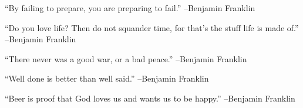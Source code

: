 \documentclass{article}%
\begin{document}
\linebreak%
\vspace{1mm}%
\begin{minipage}{\textwidth}%
\flushleft%
“By failing to prepare, you are preparing to fail.”%
\linebreak%
\vspace{1mm}%
–Benjamin Franklin%
\linebreak%
\vspace{1mm}%
\end{minipage}%
\linebreak%
\vspace{1mm}%
\begin{minipage}{\textwidth}%
\flushleft%
“Do you love life? Then do not squander time, for that's the stuff life is made of.”%
\linebreak%
\vspace{1mm}%
–Benjamin Franklin%
\linebreak%
\vspace{1mm}%
\end{minipage}%
\linebreak%
\vspace{1mm}%
\begin{minipage}{\textwidth}%
\flushleft%
“There never was a good war, or a bad peace.”%
\linebreak%
\vspace{1mm}%
–Benjamin Franklin%
\linebreak%
\vspace{1mm}%
\end{minipage}%
\linebreak%
\vspace{1mm}%
\begin{minipage}{\textwidth}%
\flushleft%
“Well done is better than well said.”%
\linebreak%
\vspace{1mm}%
–Benjamin Franklin%
\linebreak%
\vspace{1mm}%
\end{minipage}%
\linebreak%
\vspace{1mm}%
\begin{minipage}{\textwidth}%
\flushleft%
“Beer is proof that God loves us and wants us to be happy.”%
\linebreak%
\vspace{1mm}%
–Benjamin Franklin%
\linebreak%
\vspace{1mm}%
\end{minipage}%
\end{document}
